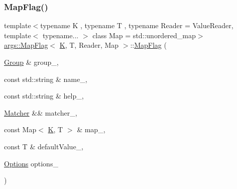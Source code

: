 \subsubsection{\texorpdfstring{Map\+Flag()}{MapFlag()}\hspace{0.1cm}{\footnotesize\ttfamily [1/3]}}
{\footnotesize\ttfamily template$<$typename K , typename T , typename Reader  = Value\+Reader, template$<$ typename... $>$ class Map = std\+::unordered\+\_\+map$>$ \\
\hyperlink{classargs_1_1_map_flag}{args\+::\+Map\+Flag}$<$ \hyperlink{cgal__test_8cpp_a891e241aa245ae63618f03737efba309}{K}, T, Reader, Map $>$\+::\hyperlink{classargs_1_1_map_flag}{Map\+Flag} (\begin{DoxyParamCaption}\item[{\hyperlink{classargs_1_1_group}{Group} \&}]{group\+\_\+,  }\item[{const std\+::string \&}]{name\+\_\+,  }\item[{const std\+::string \&}]{help\+\_\+,  }\item[{\hyperlink{classargs_1_1_matcher}{Matcher} \&\&}]{matcher\+\_\+,  }\item[{const Map$<$ \hyperlink{cgal__test_8cpp_a891e241aa245ae63618f03737efba309}{K}, T $>$ \&}]{map\+\_\+,  }\item[{const T \&}]{default\+Value\+\_\+,  }\item[{\hyperlink{namespaceargs_aa530c0f95194aa275f49a5f299ac9e77}{Options}}]{options\+\_\+ }\end{DoxyParamCaption})\hspace{0.3cm}{\ttfamily [inline]}}

\mbox{\label{classargs_1_1_map_flag_a9e13951a327b382cfaa5caf8a0ecd9c9}} 
